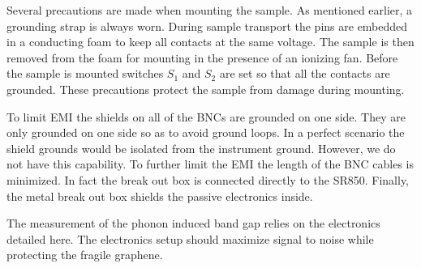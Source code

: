 Several precautions are made when mounting the sample.
As mentioned earlier, a grounding strap is always worn.
During sample transport the pins are embedded in a conducting foam to keep all contacts at the same voltage.
The sample is then removed from the foam for mounting in the presence of an ionizing fan.
Before the sample is mounted switches $S_1$ and $S_2$ are set so that all the contacts are grounded.
These precautions protect the sample from damage during mounting.

To limit EMI the shields on all of the BNCs are grounded on one side.
They are only grounded on one side so as to avoid ground loops.
In a perfect scenario the shield grounds would be isolated from the instrument ground.
However, we do not have this capability.
To further limit the EMI the length of the BNC cables is minimized.
In fact the break out box is connected directly to the SR850.
Finally, the metal break out box shields the passive electronics inside.

The measurement of the phonon induced band gap relies on the electronics detailed here.
The electronics setup should maximize signal to noise while protecting the fragile graphene.